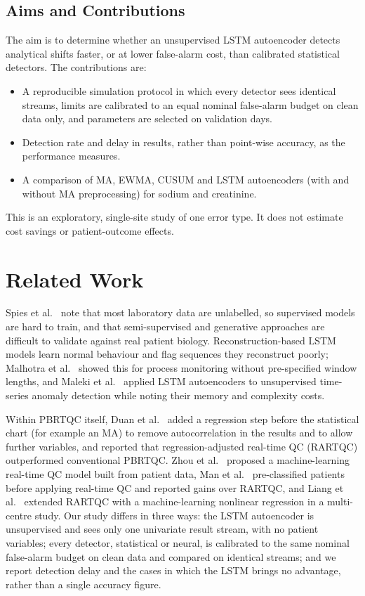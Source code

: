 \documentclass[conference]{IEEEtran}
\begin{document}
\subsection{Aims and Contributions}
The aim is to determine whether an unsupervised LSTM autoencoder detects analytical shifts faster, or at lower false-alarm cost, than calibrated statistical detectors. The contributions are:
\begin{itemize}
  \item A reproducible simulation protocol in which every detector sees identical streams, limits are calibrated to an equal nominal false-alarm budget on clean data only, and parameters are selected on validation days.
  \item Detection rate and delay in results, rather than point-wise accuracy, as the performance measures.
  \item A comparison of MA, EWMA, CUSUM and LSTM autoencoders (with and without MA preprocessing) for sodium and creatinine.
\end{itemize}
This is an exploratory, single-site study of one error type. It does not estimate cost savings or patient-outcome effects.

\section{Related Work}
Spies et al.\ \cite{Spies2023} note that most laboratory data are unlabelled, so supervised models are hard to train, and that semi-supervised and generative approaches are difficult to validate against real patient biology. Reconstruction-based LSTM models learn normal behaviour and flag sequences they reconstruct poorly; Malhotra et al.\ \cite{Malhotra2015} showed this for process monitoring without pre-specified window lengths, and Maleki et al.\ \cite{Maleki2021} applied LSTM autoencoders to unsupervised time-series anomaly detection while noting their memory and complexity costs.

Within PBRTQC itself, Duan et al.\ \cite{Duan2021} added a regression step before the statistical chart (for example an MA) to remove autocorrelation in the results and to allow further variables, and reported that regression-adjusted real-time QC (RARTQC) outperformed conventional PBRTQC. Zhou et al.\ \cite{Zhou2022} proposed a machine-learning real-time QC model built from patient data, Man et al.\ \cite{Man2023} pre-classified patients before applying real-time QC and reported gains over RARTQC, and Liang et al.\ \cite{Liang2024} extended RARTQC with a machine-learning nonlinear regression in a multi-centre study. Our study differs in three ways: the LSTM autoencoder is unsupervised and sees only one univariate result stream, with no patient variables; every detector, statistical or neural, is calibrated to the same nominal false-alarm budget on clean data and compared on identical streams; and we report detection delay and the cases in which the LSTM brings no advantage, rather than a single accuracy figure.
\end{document}

